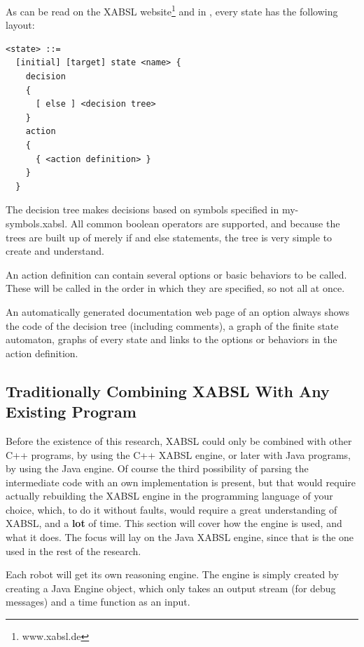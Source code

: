 \documentclass[a4paper,10pt]{article}
\begin{document}
\begin{itemize}
    As can be read on the XABSL website\footnote{www.xabsl.de} and in
    \cite{loetzsch2004xabsl}, every state has the following layout: 
    \vspace{-.3cm}
    \begin{verbatim}
<state> ::=
  [initial] [target] state <name> {
    decision
    {
      [ else ] <decision tree>
    }
    action
    {
      { <action definition> }
    }
  }
    \end{verbatim}
    \vspace{-.7cm}
    The decision tree makes decisions based on symbols specified in
    my-symbols.xabsl. All common boolean operators are supported, and because
    the trees are built up of merely if and else statements, the tree is very
    simple to create and understand. 

    An action definition can contain several options or basic behaviors to be
    called. These will be called in the order in which they are specified, so
    not all at once.

    An automatically generated documentation web page of an option always shows the code of
    the decision tree (including comments), a graph of the finite state
    automaton, graphs of every state and links to the options or behaviors in
    the action definition.
\end{itemize}

\subsection{Traditionally Combining XABSL With Any Existing Program}
\label{sec:xabsl-engine}
Before the existence of this research, XABSL could only be combined with other
C++ programs, by using the C++ XABSL engine, or later with Java programs, by
using the Java engine. Of course the third possibility of parsing the
intermediate code with an own implementation is present, but that would require
actually rebuilding the XABSL engine in the programming language of your choice,
which, to do it without faults, would require a great understanding of XABSL,
and a \textbf{lot} of time. This section will cover how the engine is used, and
what it does. The focus will lay on the Java XABSL engine, since that is the one
used in the rest of the research.

Each robot will get its own reasoning engine. The engine is simply created by
creating a Java Engine object, which only takes an output stream (for debug
messages) and a time function as an input. 
\end{document}
